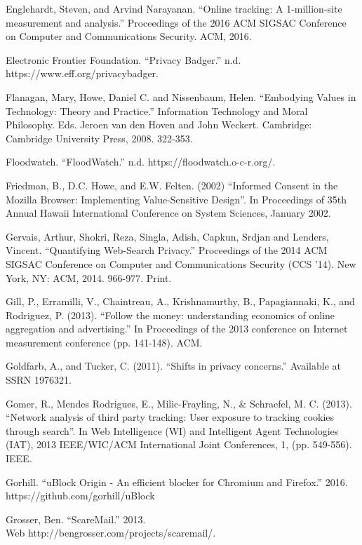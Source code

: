 \documentclass[conference]{IEEEtran}
\begin{document}
\begin{thebibliography}{99}
 Englehardt, Steven, and Arvind Narayanan. “Online tracking: A 1-million-site measurement and analysis.” Proceedings of the 2016 ACM SIGSAC Conference on Computer and Communications Security. ACM, 2016.

 Electronic Frontier Foundation. “Privacy Badger.” n.d. https://www.eff.org/privacybadger.

 Flanagan, Mary, Howe, Daniel C. and Nissenbaum, Helen. “Embodying Values in Technology: Theory and Practice.” Information Technology and Moral Philosophy. Eds. Jeroen van den Hoven and John Weckert. Cambridge: Cambridge University Press, 2008. 322-353.

 Floodwatch. “FloodWatch.” n.d. https://floodwatch.o-c-r.org/.

 Friedman, B., D.C. Howe, and E.W. Felten. (2002) “Informed Consent in the Mozilla Browser: Implementing Value-Sensitive Design”. In Proceedings of 35th Annual Hawaii International Conference on System Sciences, January 2002.

 Gervais, Arthur, Shokri, Reza, Singla, Adish, Capkun, Srdjan and Lenders, Vincent. “Quantifying Web-Search Privacy.” Proceedings of the 2014 ACM SIGSAC Conference on Computer and Communications Security (CCS '14). New York, NY: ACM, 2014. 966-977. Print.

 Gill, P., Erramilli, V., Chaintreau, A., Krishnamurthy, B., Papagiannaki, K., and Rodriguez, P. (2013). “Follow the money: understanding economics of online aggregation and advertising.” In Proceedings of the 2013 conference on Internet measurement conference (pp. 141-148). ACM.

 Goldfarb, A., and Tucker, C. (2011). “Shifts in privacy concerns.” Available at SSRN 1976321.

 Gomer, R., Mendes Rodrigues, E., Milic-Frayling, N., \& Schraefel, M. C. (2013). “Network analysis of third party tracking: User exposure to tracking cookies through search”. In Web Intelligence (WI) and Intelligent Agent Technologies (IAT), 2013 IEEE/WIC/ACM International Joint Conferences, 1, (pp. 549-556). IEEE.

 Gorhill. “uBlock Origin - An efficient blocker for Chromium and Firefox.” 2016. https://github.com/gorhill/uBlock

 Grosser, Ben. “ScareMail.” 2013.\\ Web http://bengrosser.com/projects/scaremail/.


\end{thebibliography}
\end{document}
